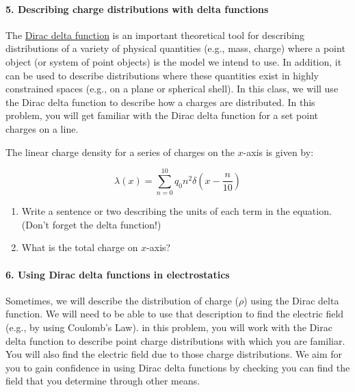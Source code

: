 \documentclass[11pt]{article}
\def\tightlist{}
\begin{document}
\paragraph{5. Describing charge distributions with delta
functions}\label{describing-charge-distributions-with-delta-functions}

The \href{https://en.wikipedia.org/wiki/Dirac_delta_function}{Dirac
delta function} is an important theoretical tool for describing
distributions of a variety of physical quantities (e.g., mass, charge)
where a point object (or system of point objects) is the model we intend
to use. In addition, it can be used to describe distributions where
these quantities exist in highly constrained spaces (e.g., on a plane or
spherical shell). In this class, we will use the Dirac delta function to
describe how a charges are distributed. In this problem, you will get
familiar with the Dirac delta function for a set point charges on a
line.

The linear charge density for a series of charges on the \(x\)-axis is
given by:

\[\lambda(x) = \sum_{n=0}^{10} q_0 n^2\delta\left(x-\dfrac{n}{10}\right)\]

\begin{enumerate}
\def\labelenumi{\arabic{enumi}.}
\tightlist
\item
  Write a sentence or two describing the units of each term in the
  equation. (Don't forget the delta function!)
\item
  What is the total charge on \(x\)-axis?
\end{enumerate}

\paragraph{6. Using Dirac delta functions in
electrostatics}\label{using-dirac-delta-functions-in-electrostatics}

Sometimes, we will describe the distribution of charge (\(\rho\)) using
the Dirac delta function. We will need to be able to use that
description to find the electric field (e.g., by using Coulomb's Law).
in this problem, you will work with the Dirac delta function to describe
point charge distributions with which you are familiar. You will also
find the electric field due to those charge distributions. We aim for
you to gain confidence in using Dirac delta functions by checking you
can find the field that you determine through other means.
\end{document}
